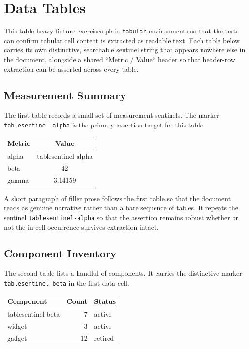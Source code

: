 \documentclass{article}
\begin{document}
\section{Data Tables}
This table-heavy fixture exercises plain \texttt{tabular} environments so that
the tests can confirm tabular cell content is extracted as readable text. Each
table below carries its own distinctive, searchable sentinel string that
appears nowhere else in the document, alongside a shared ``Metric / Value``
header so that header-row extraction can be asserted across every table.

\subsection{Measurement Summary}
The first table records a small set of measurement sentinels. The marker
\texttt{tablesentinel-alpha} is the primary assertion target for this table.

\begin{center}
\begin{tabular}{|l|c|}
\hline
Metric & Value \\
\hline
alpha & tablesentinel-alpha \\
beta & 42 \\
gamma & 3.14159 \\
\hline
\end{tabular}
\end{center}

A short paragraph of filler prose follows the first table so that the document
reads as genuine narrative rather than a bare sequence of tables. It repeats
the sentinel \texttt{tablesentinel-alpha} so that the assertion remains robust
whether or not the in-cell occurrence survives extraction intact.

\subsection{Component Inventory}
The second table lists a handful of components. It carries the distinctive
marker \texttt{tablesentinel-beta} in the first data cell.

\begin{center}
\begin{tabular}{|l|r|l|}
\hline
Component & Count & Status \\
\hline
tablesentinel-beta & 7 & active \\
widget & 3 & active \\
gadget & 12 & retired \\
\hline
\end{tabular}
\end{center}
\end{document}
